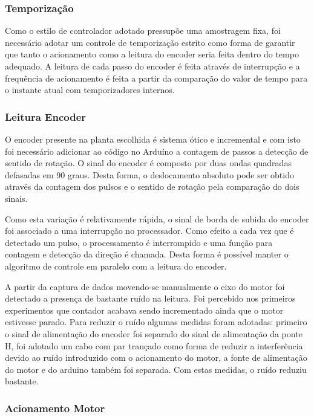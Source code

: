 \documentclass[a4paper,11pt]{article}
\begin{document}
\subsubsection{Temporização}

Como o estilo de controlador adotado pressupõe uma amostragem fixa, foi necessário adotar um controle de temporização estrito como forma de garantir que tanto o acionamento como a leitura do encoder seria feita dentro do tempo adequado. A leitura de cada passo do encoder é feita através de interrupção e a frequência de acionamento é feita a partir da comparação do valor de tempo para o instante atual com temporizadores internos.

\subsubsection{Leitura Encoder}

O encoder presente na planta escolhida é sistema ótico e incremental e com isto foi necessário adicionar ao código no Arduíno a contagem de passos a detecção de sentido de rotação. O sinal do encoder é composto por duas ondas quadradas defasadas em 90 graus. Desta forma, o deslocamento absoluto pode ser obtido através da contagem dos pulsos e o sentido de rotação pela comparação do dois sinais.


Como esta variação é relativamente rápida, o sinal de borda de subida do encoder foi associado a uma interrupção no processador. Como efeito a cada vez que é detectado um pulso, o processamento é interrompido e uma função para contagem e detecção da direção é chamada. Desta forma é possível manter o algoritmo de controle em paralelo com a leitura do encoder.

A partir da captura de dados movendo-se manualmente o eixo do motor foi detectado a presença de bastante ruído na leitura. Foi percebido nos primeiros experimentos que contador acabava sendo incrementado ainda que o motor estivesse parado. Para reduzir o ruído algumas medidas foram adotadas: primeiro o sinal de alimentação do encoder foi separado do sinal de alimentação da ponte H, foi adotado um cabo com par trançado como forma de reduzir a interferência devido ao ruído introduzido com o acionamento do motor, a fonte de alimentação do motor e do arduino também foi separada. Com estas medidas, o ruído reduziu bastante.

\subsubsection{Acionamento Motor}
\end{document}
